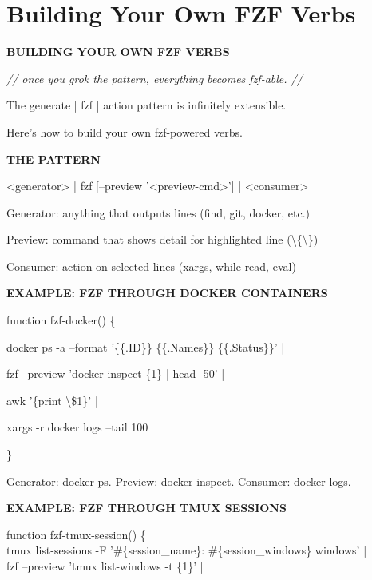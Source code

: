 \documentclass[11pt,a4paper,twoside]{book}
\begin{document}
\vspace{16pt}

\section{Building Your Own FZF Verbs}


\vspace{10pt}
{\large\bfseries\color{neoncyan} BUILDING YOUR OWN FZF VERBS}\vspace{6pt}

{\small\itshape\color{dimtext} // once you grok the pattern, everything becomes fzf-able. //}

The generate | fzf | action pattern is infinitely extensible.

Here's how to build your own fzf-powered verbs.


\vspace{12pt}
{\bfseries\color{neonyellow} THE PATTERN}\vspace{4pt}

<generator> | fzf [--preview '<preview-cmd>'] | <consumer>

Generator: anything that outputs lines (find, git, docker, etc.)

Preview: command that shows detail for highlighted line (\textbackslash{}\{\textbackslash{}\})

Consumer: action on selected lines (xargs, while read, eval)


\vspace{12pt}
{\bfseries\color{neonyellow} EXAMPLE: FZF THROUGH DOCKER CONTAINERS}\vspace{4pt}

function fzf-docker() \{

docker ps -a --format '\{\{.ID\}\} \{\{.Names\}\} \{\{.Status\}\}' |

fzf --preview 'docker inspect \{1\} | head -50' |

awk '\{print \textbackslash{}\$1\}' |

xargs -r docker logs --tail 100

\}

Generator: docker ps. Preview: docker inspect. Consumer: docker logs.


\vspace{12pt}
{\bfseries\color{neonyellow} EXAMPLE: FZF THROUGH TMUX SESSIONS}\vspace{4pt}

\begin{codebox}
function fzf-tmux-session() \{\\
tmux list-sessions -F '\#\{session\_name\}: \#\{session\_windows\} windows' |\\
fzf --preview 'tmux list-windows -t \{1\}' |\\
\end{codebox}
\end{document}
